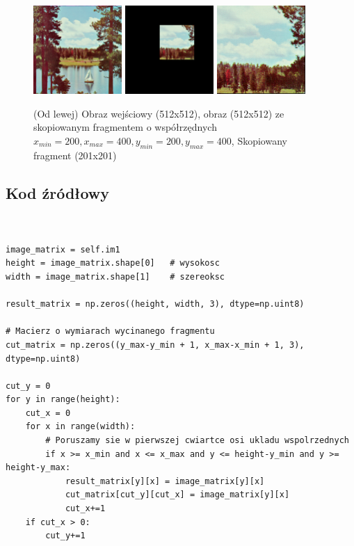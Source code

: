\documentclass[final,a4paper,openany,12pt]{mwbk}
\begin{document}
\begin{figure}[H]
	\begin{center}
		\includegraphics[width=0.3\textwidth]{2/2Geo_Copy_Original}
		\includegraphics[width=0.3\textwidth]{2/2Geo_Copy_Result}
		\includegraphics[width=0.3\textwidth]{2/2Geo_Copy_Result_Interp}
	\end{center}
	\caption{(Od lewej) Obraz wejściowy (512x512), obraz (512x512) ze skopiowanym fragmentem o współrzędnych $x_{min}=200, x_{max}=400, y_{min}=200, y_{max}=400$, Skopiowany fragment (201x201) }
\end{figure}


\subsection*{Kod źródłowy}

\begin{lstlisting}[caption= Kopiowanie fragmentów obrazów]


image_matrix = self.im1
height = image_matrix.shape[0]   # wysokosc
width = image_matrix.shape[1]    # szereoksc

result_matrix = np.zeros((height, width, 3), dtype=np.uint8)

# Macierz o wymiarach wycinanego fragmentu
cut_matrix = np.zeros((y_max-y_min + 1, x_max-x_min + 1, 3), dtype=np.uint8)

cut_y = 0
for y in range(height):
    cut_x = 0
    for x in range(width): 
        # Poruszamy sie w pierwszej cwiartce osi ukladu wspolrzednych
        if x >= x_min and x <= x_max and y <= height-y_min and y >= height-y_max:    
            result_matrix[y][x] = image_matrix[y][x]
            cut_matrix[cut_y][cut_x] = image_matrix[y][x]
            cut_x+=1
    if cut_x > 0:    
        cut_y+=1

\end{lstlisting}
\end{document}
